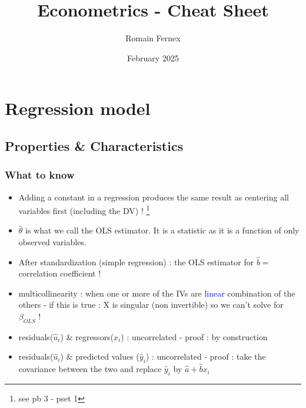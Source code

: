 \documentclass{article}
\title{Econometrics - Cheat Sheet}
\author{Romain Fernex}
\date{February 2025}
\begin{document}
\maketitle
\tableofcontents

\section{Regression model}

\subsection{Properties \& Characteristics}

\subsubsection{What to know }
\begin{itemize}
    \item Adding a constant in a regression produces the same result as centering all variables first (including the DV) ! \footnote{see pb 3 - pset 1}
    \item $\hat{\theta}$ is what we call the OLS estimator. It is a statistic as it is a function of only observed variables.
    \item After standardization (simple regression) : the OLS estimator for $\hat{b} =$ correlation coefficient ! 
    \item multicollinearity : when one or more of the IVs are \textcolor{blue}{linear} combination of the others
        \subitem - if this is true : X is singular (non invertible) so we can't solve for $\beta_{OLS}$ !
\end{itemize}
\begin{correlationbox}
\begin{itemize}
    \item residuals($\hat{u}_i$) \& regressors($x_i$) : uncorrelated
    \subitem - proof : by construction
    \item residuals($\hat{u}_i$) \& predicted values ($\hat{y}_i$) : uncorrelated
     \subitem - proof : take the covariance between the two and replace $\hat{y}_i$ by $\hat{a}+\hat{b}x_i$
\end{itemize}
\end{correlationbox}
\end{document}
